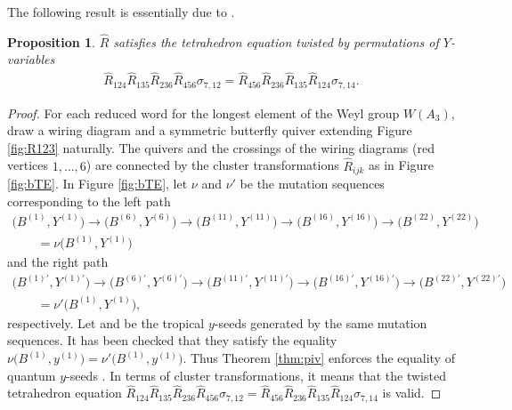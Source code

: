 \documentclass[pdftex]{sigma}
\numberwithin{equation}{section}
\newtheorem{Proposition}[Theorem]{Proposition}
 { \theoremstyle{definition}
\newtheorem{Example}[Theorem]{Example}
\newtheorem{Remark}[Theorem]{Remark} }
\begin{document}
The following result is essentially due to \cite{SY22}.
\begin{Proposition}\label{pr:sy}
$\widehat{R}$ satisfies the tetrahedron equation twisted by permutations of $Y$-variables
\begin{align}\label{TE1}
\widehat{R} _{124}\widehat{R} _{135}\widehat{R} _{236} \widehat{R} _{456}\sigma_{7,12}=
\widehat{R} _{456}\widehat{R} _{236}\widehat{R} _{135}\widehat{R} _{124}\sigma_{7,14} .
\end{align}
\end{Proposition}
\begin{proof}
 For each reduced word for the longest element of the Weyl group
 $W(A_3)$, draw a wiring diagram and a symmetric butterfly quiver
 extending Figure \ref{fig:R123} naturally. The quivers and the
 crossings of the wiring diagrams (red vertices $1, \dots, 6$) are
 connected by the cluster transformations $\widehat{R}_{ijk}$ as in
 Figure \ref{fig:bTE}. %
In Figure \ref{fig:bTE},
let $\nu$ and $\nu'$ be the mutation sequences corresponding to the left path
\begin{gather*}
\bigl(B^{(1)},Y^{(1)}\bigr) \rightarrow
\bigl(B^{(6)},Y^{(6)}\bigr) \rightarrow
\bigl(B^{(11)},Y^{(11)}\bigr) \rightarrow
\bigl(B^{(16)},Y^{(16)}\bigr) \rightarrow
\bigl(B^{(22)},Y^{(22)}\bigr)\\
\qquad=\nu\bigl(B^{(1)},Y^{(1)}\bigr)
\end{gather*}
and the right path
\begin{gather*}
\bigl(B^{(1)\prime},Y^{(1)\prime}\bigr) \rightarrow
\bigl(B^{(6)\prime},Y^{(6)\prime}\bigr) \rightarrow
\bigl(B^{(11)\prime},Y^{(11)\prime}\bigr) \rightarrow
\bigl(B^{(16)\prime},Y^{(16)\prime}\bigr) \rightarrow
 \bigl(B^{(22)\prime},Y^{(22)\prime}\bigr)\\
 \qquad=\nu'\bigl(B^{(1)},Y^{(1)}\bigr),
\end{gather*}
 respectively.
Let  and  be the
tropical $y$-seeds generated by the same mutation sequences.
It has been checked \cite[Section~A.2]{SY22}
that they satisfy the equality
$\nu\bigl(B^{(1)},y^{(1)}\bigr)= \nu'\bigl(B^{(1)},y^{(1)}\bigr)$.
Thus Theorem \ref{thm:piv} enforces the equality of quantum $y$-seeds
.
In terms of cluster transformations, it means that the twisted tetrahedron equation
$\widehat{R}_{124}\widehat{R}_{135}\widehat{R}_{236}\widehat{R}_{456}\sigma_{7,12}
=\widehat{R}_{456}\widehat{R}_{236}\widehat{R}_{135}\widehat{R}_{124} \sigma_{7,14}$ is valid.
\end{proof}
\end{document}
